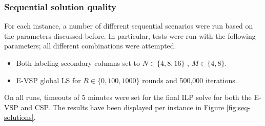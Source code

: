 \documentclass[]{article}
\begin{document}
\subsubsection{Sequential solution quality}
For each instance, a number of different sequential scenarios were run based on the parameters discussed before. In particular, tests were run with the following parameters; all different combinations were attempted.
\begin{itemize}
  \item Both labeling secondary columns set to $N \in \{ 4, 8, 16 \}$ , $M \in \{ 4, 8 \}$.
  \item E-VSP global LS for $R \in \{ 0, 100, 1000 \}$ rounds and 500,000 iterations. 
\end{itemize}
On all runs, timeouts of 5 minutes were set for the final ILP solve for both the E-VSP and CSP. The results have been displayed per instance in Figure \ref{fig:seq-solutions}.
\end{document}
